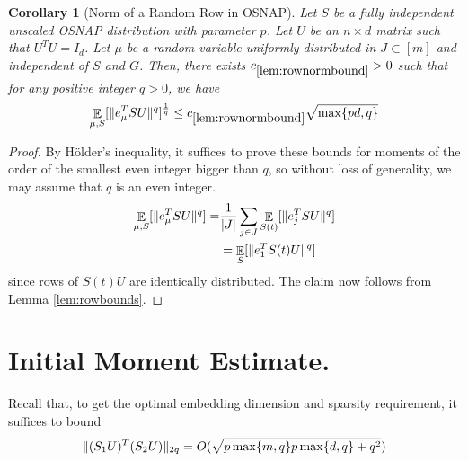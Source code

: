 \documentclass[11pt]{amsart}
\numberwithin{equation}{section}
\numberwithin{equation}{section}
\DeclareMathOperator{\E}{\mathbb{E}}
\DeclarePairedDelimiter{\norm}{\lVert}{\rVert}
\DeclarePairedDelimiter{\abs}{\lvert}{\rvert}
\newtheorem{corollary}[theorem]{Corollary}
\begin{document}
\begin{corollary}[Norm of a Random Row in OSNAP]\label{lem:rownormbound}
    Let $S$ be a fully independent unscaled OSNAP distribution with parameter $p$. Let $U$ be an $n \times d$ matrix such that $U^TU=I_d$. Let $\mu$ be a random variable uniformly distributed in $
    J \subset [m]$ and independent of $S$ and $G$. Then, there exists $c_{\ref{lem:rownormbound}}> 0$ such that for any positive integer $q>0$, we have
    \begin{align*}
        \E_{\mu, S} [ \norm{e_{\mu}^TSU}^{q} ]^\frac{1}{q} \le c_{\ref{lem:rownormbound}}\sqrt{\max\{pd,q \}} 
    \end{align*}

\end{corollary}
\begin{proof}
    By Hölder's inequality, it suffices to prove these bounds for moments of the order of the smallest even integer bigger than $q$, so without loss of generality, we may assume that $q$ is an even integer. 
    \begin{align*}
        \E_{\mu, S} [ \norm{e_{\mu}^TSU}^{q}] =& \frac{1}{\abs{J}}\sum_{j \in J} \E_{S(t)} [ \norm{e_{j}^TSU}^{q}] \\
        & = \E_{S} [ \norm{e_{1}^TS(t)U}^{q}]
    \end{align*}
    since rows of $S(t)U$ are identically distributed. The claim now follows from Lemma \ref{lem:rowbounds}.



\end{proof}







\section{Initial Moment Estimate.} \label{sec:initialmom}

Recall that, to get the optimal embedding dimension and sparsity requirement, it suffices to bound
\begin{equation}\label{eq:optmomcopy}
    \begin{aligned}
    \norm{(S_1 U)^T(S_2 U)}_{2q} = O(\sqrt{p\max\{m,q\}p\max\{d,q\}+q^2})
\end{aligned}
\end{equation}
\end{document}
